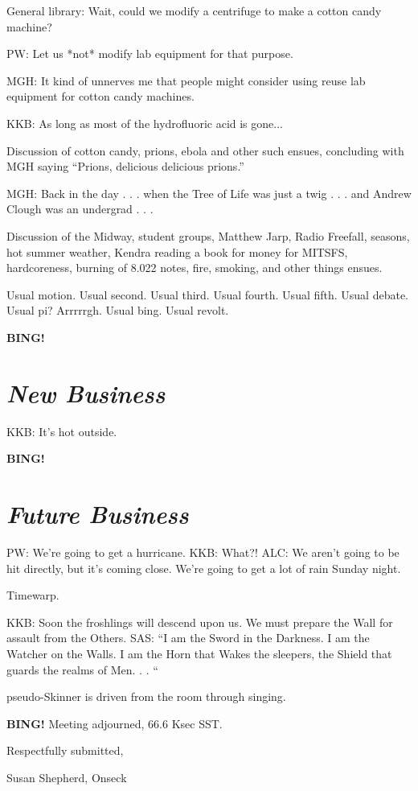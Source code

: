 \documentclass[10pt]{article}
\newcommand{\bing}{{\bf BING!} }
\newcommand{\goto}[1]{\bing \vskip 12pt \section*{{\em{#1}}}}
\begin{document}
General library: Wait, could we modify a centrifuge to make a cotton candy machine?

PW: Let us *not* modify lab equipment for that purpose.

MGH: It kind of unnerves me that people might consider using reuse lab equipment for cotton candy machines.

KKB: As long as most of the hydrofluoric acid is gone...

Discussion of cotton candy, prions, ebola and other such ensues, concluding with MGH saying ``Prions, delicious delicious prions.''

MGH: Back in the day . . . when the Tree of Life was just a twig . . . and Andrew Clough was an undergrad . . . 

Discussion of the Midway, student groups, Matthew Jarp, Radio Freefall, seasons, hot summer weather, Kendra reading a book for money for MITSFS, hardcoreness, burning of 8.022 notes, fire, smoking, and other things ensues.

Usual motion. Usual second. Usual third. Usual fourth. Usual fifth. Usual debate. Usual pi? Arrrrrgh. Usual bing. Usual revolt.

\goto{New Business}

KKB: It's hot outside.

\goto{Future Business}

PW: We're going to get a hurricane. KKB: What?! ALC: We aren't going to be hit directly, but it's coming close. We're going to get a lot of rain Sunday night.

Timewarp.

KKB: Soon the froshlings will descend upon us. We must prepare the Wall for assault from the Others.
SAS: ``I am the Sword in the Darkness. I am the Watcher on the Walls. I am the Horn that Wakes the sleepers, the Shield that guards the realms of Men. . . ``

pseudo-Skinner is driven from the room through singing.

\bing
\noindent
Meeting adjourned, 66.6 Ksec SST.

\vspace{18pt}

\centerline{Respectfully submitted,}
\centerline{Susan Shepherd, Onseck}
\end{document}
